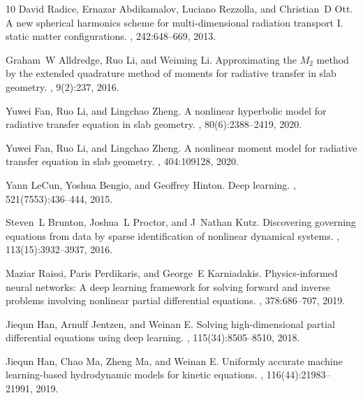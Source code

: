 \documentclass[11pt]{article}
\numberwithin{equation}{section}
\begin{document}
\begin{thebibliography}{10}
David Radice, Ernazar Abdikamalov, Luciano Rezzolla, and Christian~D Ott.
\newblock A new spherical harmonics scheme for multi-dimensional radiation
  transport {I}. static matter configurations.
, 242:648--669, 2013.

Graham~W Alldredge, Ruo Li, and Weiming Li.
\newblock Approximating the $ {M}_2 $ method by the extended quadrature method
  of moments for radiative transfer in slab geometry.
, 9(2):237, 2016.

Yuwei Fan, Ruo Li, and Lingchao Zheng.
\newblock A nonlinear hyperbolic model for radiative transfer equation in slab
  geometry.
, 80(6):2388--2419, 2020.

Yuwei Fan, Ruo Li, and Lingchao Zheng.
\newblock A nonlinear moment model for radiative transfer equation in slab
  geometry.
, 404:109128, 2020.

Yann LeCun, Yoshua Bengio, and Geoffrey Hinton.
\newblock Deep learning.
, 521(7553):436--444, 2015.

Steven~L Brunton, Joshua~L Proctor, and J~Nathan Kutz.
\newblock Discovering governing equations from data by sparse identification of
  nonlinear dynamical systems.
,
  113(15):3932--3937, 2016.

Maziar Raissi, Paris Perdikaris, and George~E Karniadakis.
\newblock Physics-informed neural networks: {A} deep learning framework for
  solving forward and inverse problems involving nonlinear partial differential
  equations.
, 378:686--707, 2019.

Jiequn Han, Arnulf Jentzen, and Weinan E.
\newblock Solving high-dimensional partial differential equations using deep
  learning.
,
  115(34):8505--8510, 2018.

Jiequn Han, Chao Ma, Zheng Ma, and Weinan E.
\newblock Uniformly accurate machine learning-based hydrodynamic models for
  kinetic equations.
,
  116(44):21983--21991, 2019.


\end{thebibliography}
\end{document}
